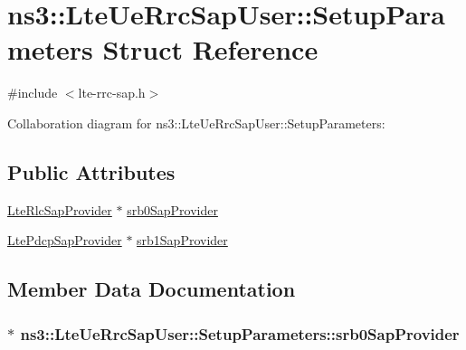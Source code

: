 \hypertarget{structns3_1_1LteUeRrcSapUser_1_1SetupParameters}{}\section{ns3\+:\+:Lte\+Ue\+Rrc\+Sap\+User\+:\+:Setup\+Parameters Struct Reference}
\label{structns3_1_1LteUeRrcSapUser_1_1SetupParameters}


{\ttfamily \#include $<$lte-\/rrc-\/sap.\+h$>$}



Collaboration diagram for ns3\+:\+:Lte\+Ue\+Rrc\+Sap\+User\+:\+:Setup\+Parameters\+:
\subsection*{Public Attributes}
\begin{DoxyCompactItemize}
\item 
\hyperlink{classns3_1_1LteRlcSapProvider}{Lte\+Rlc\+Sap\+Provider} $\ast$ \hyperlink{structns3_1_1LteUeRrcSapUser_1_1SetupParameters_a0c4f35b04e1ace11d3f18e4b57415c1d}{srb0\+Sap\+Provider}
\item 
\hyperlink{classns3_1_1LtePdcpSapProvider}{Lte\+Pdcp\+Sap\+Provider} $\ast$ \hyperlink{structns3_1_1LteUeRrcSapUser_1_1SetupParameters_ac80dc697937158476f8787ca249cbb8e}{srb1\+Sap\+Provider}
\end{DoxyCompactItemize}


\subsection{Member Data Documentation}
\subsubsection[{\texorpdfstring{srb0\+Sap\+Provider}{srb0SapProvider}}]{$\ast$ ns3\+::\+Lte\+Ue\+Rrc\+Sap\+User\+::\+Setup\+Parameters\+::srb0\+Sap\+Provider}\hypertarget{structns3_1_1LteUeRrcSapUser_1_1SetupParameters_a0c4f35b04e1ace11d3f18e4b57415c1d}{}\label{structns3_1_1LteUeRrcSapUser_1_1SetupParameters_a0c4f35b04e1ace11d3f18e4b57415c1d}
